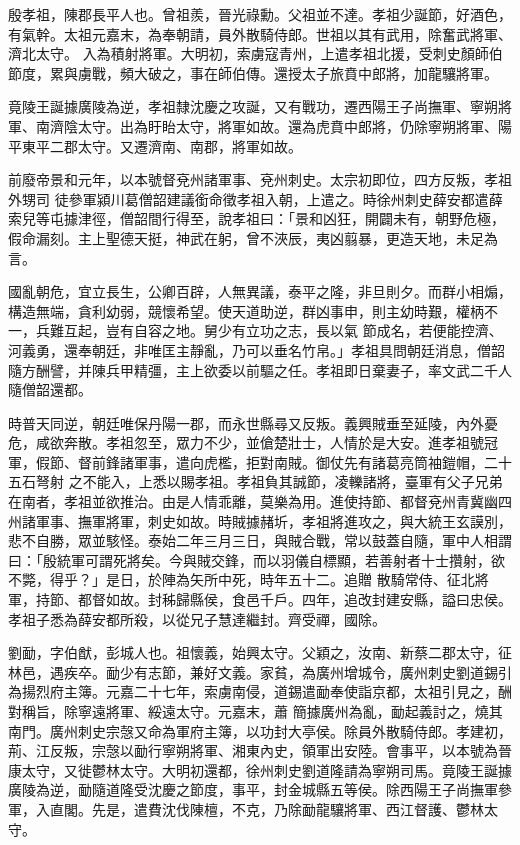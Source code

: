 
\begin{pinyinscope}

 殷孝祖，陳郡長平人也。曾祖羨，晉光祿勳。父祖並不達。孝祖少誕節，好酒色，有氣幹。太祖元嘉末，為奉朝請，員外散騎侍郎。世祖以其有武用，除奮武將軍、濟北太守。
 入為積射將軍。大明初，索虜寇青州，上遣孝祖北援，受刺史顏師伯節度，累與虜戰，頻大破之，事在師伯傳。還授太子旅賁中郎將，加龍驤將軍。



 竟陵王誕據廣陵為逆，孝祖隸沈慶之攻誕，又有戰功，遷西陽王子尚撫軍、寧朔將軍、南濟陰太守。出為盱眙太守，將軍如故。還為虎賁中郎將，仍除寧朔將軍、陽平東平二郡太守。又遷濟南、南郡，將軍如故。



 前廢帝景和元年，以本號督兗州諸軍事、兗州刺史。太宗初即位，四方反叛，孝祖外甥司
 徒參軍潁川葛僧韶建議銜命徵孝祖入朝，上遣之。時徐州刺史薛安都遣薛索兒等屯據津徑，僧韶間行得至，說孝祖曰：「景和凶狂，開闢未有，朝野危極，假命漏刻。主上聖德天挺，神武在躬，曾不浹辰，夷凶翦暴，更造天地，未足為言。



 國亂朝危，宜立長生，公卿百辟，人無異議，泰平之隆，非旦則夕。而群小相煽，構造無端，貪利幼弱，競懷希望。使天道助逆，群凶事申，則主幼時艱，權柄不一，兵難互起，豈有自容之地。舅少有立功之志，長以氣
 節成名，若便能控濟、河義勇，還奉朝廷，非唯匡主靜亂，乃可以垂名竹帛。」孝祖具問朝廷消息，僧韶隨方酬譬，并陳兵甲精彊，主上欲委以前驅之任。孝祖即日棄妻子，率文武二千人隨僧韶還都。



 時普天同逆，朝廷唯保丹陽一郡，而永世縣尋又反叛。義興賊垂至延陵，內外憂危，咸欲奔散。孝祖忽至，眾力不少，並傖楚壯士，人情於是大安。進孝祖號冠軍，假節、督前鋒諸軍事，遣向虎檻，拒對南賊。御仗先有諸葛亮筒袖鎧帽，二十五石弩射
 之不能入，上悉以賜孝祖。孝祖負其誠節，凌轢諸將，臺軍有父子兄弟在南者，孝祖並欲推治。由是人情乖離，莫樂為用。進使持節、都督兗州青冀幽四州諸軍事、撫軍將軍，刺史如故。時賊據赭圻，孝祖將進攻之，與大統王玄謨別，悲不自勝，眾並駭怪。泰始二年三月三日，與賊合戰，常以鼓蓋自隨，軍中人相謂曰：「殷統軍可謂死將矣。今與賊交鋒，而以羽儀自標顯，若善射者十士攢射，欲不斃，得乎？」是日，於陣為矢所中死，時年五十二。追贈
 散騎常侍、征北將軍，持節、都督如故。封秭歸縣侯，食邑千戶。四年，追改封建安縣，謚曰忠侯。孝祖子悉為薛安都所殺，以從兄子慧達繼封。齊受禪，國除。



 劉勔，字伯猷，彭城人也。祖懷義，始興太守。父穎之，汝南、新蔡二郡太守，征林邑，遇疾卒。勔少有志節，兼好文義。家貧，為廣州增城令，廣州刺史劉道錫引為揚烈府主簿。元嘉二十七年，索虜南侵，道錫遣勔奉使詣京都，太祖引見之，酬對稱旨，除寧遠將軍、綏遠太守。元嘉末，蕭
 簡據廣州為亂，勔起義討之，燒其南門。廣州刺史宗愨又命為軍府主簿，以功封大亭侯。除員外散騎侍郎。孝建初，荊、江反叛，宗愨以勔行寧朔將軍、湘東內史，領軍出安陸。會事平，以本號為晉康太守，又徙鬱林太守。大明初還都，徐州刺史劉道隆請為寧朔司馬。竟陵王誕據廣陵為逆，勔隨道隆受沈慶之節度，事平，封金城縣五等侯。除西陽王子尚撫軍參軍，入直閣。先是，遣費沈伐陳檀，不克，乃除勔龍驤將軍、西江督護、鬱林太守。




\end{pinyinscope}
